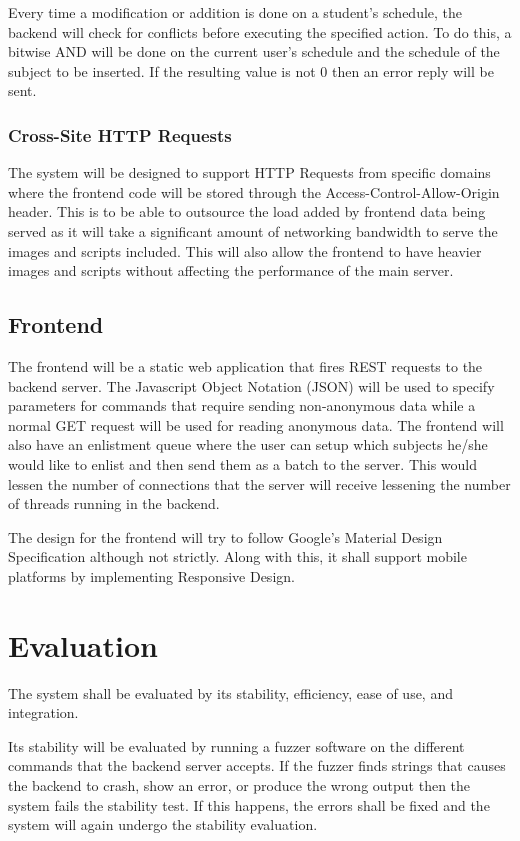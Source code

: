 \documentclass{sigchi}
\begin{document}
Every time a modification or addition is done on a student's schedule, the 
backend will check for conflicts before executing the specified action. 
To do this, a bitwise AND will be done on the current user's schedule and the
schedule of the subject to be inserted. If the resulting value is not 0 then
an error reply will be sent.

\subsubsection{Cross-Site HTTP Requests}

The system will be designed to support HTTP Requests from specific domains
where the frontend code will be stored through the Access-Control-Allow-Origin header. 
This is to be able to outsource the load added by frontend data being served as 
it will take a significant amount of networking bandwidth to serve the images and
scripts included. This will also allow the frontend to have heavier images and 
scripts without affecting the performance of the main server.


\subsection{Frontend}

The frontend will be a static web application that fires REST requests to the
backend server. The Javascript Object Notation (JSON) will be used to specify parameters
for commands that require sending non-anonymous data while a normal GET request
will be used for reading anonymous data. The frontend will also have an enlistment queue
where the user can setup which subjects he/she would like to enlist and then
send them as a batch to the server. This would lessen the number of connections
that the server will receive lessening the number of threads running in the 
backend.

The design for the frontend will try to follow Google's Material Design 
Specification although not strictly. Along with this, it shall support mobile
platforms by implementing Responsive Design. 

\section{Evaluation}

The system shall be evaluated by its stability, efficiency, ease of use, and
integration. 

Its stability will be evaluated by running a fuzzer software on the different
commands that the backend server accepts. If the fuzzer finds strings that 
causes the backend to crash, show an error, or produce the wrong output then the
system fails the stability test. If this happens, the errors shall be fixed and
the system will again undergo the stability evaluation.
\end{document}
